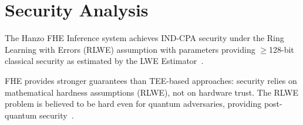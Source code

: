 \section{Security Analysis}

\label{sec:security}

\begin{theorem}
The Hanzo FHE Inference system achieves IND-CPA security under the Ring
Learning with Errors (RLWE) assumption with parameters providing $\geq$128-bit
classical security as estimated by the LWE Estimator~\cite{lweestimator}.
\end{theorem}

\begin{remark}
FHE provides stronger guarantees than TEE-based approaches: security relies on
mathematical hardness assumptions (RLWE), not on hardware trust. The RLWE
problem is believed to be hard even for quantum adversaries, providing
post-quantum security~\cite{hanzopq}.
\end{remark}

